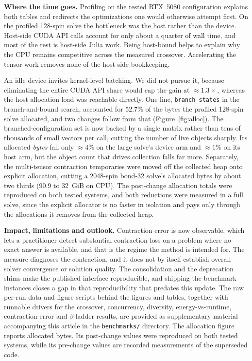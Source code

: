 \documentclass[preprint,12pt,a4paper]{elsarticle}
\begin{document}
\textbf{Where the time goes.} Profiling on the tested RTX~5080 configuration
explains both tables and redirects the optimizations one would otherwise attempt
first. On the profiled 128-spin solve the bottleneck was the host rather than the
device. Host-side CUDA API calls account for only about a quarter of wall time, and
most of the rest is host-side Julia work. Being host-bound helps to explain why
the CPU remains competitive across the measured crossover. Accelerating the tensor work removes none
of the host-side bookkeeping.

An idle device invites kernel-level batching. We did not pursue it, because
eliminating the entire CUDA API share would cap the gain at ${\approx}1.3\times$,
whereas the host allocation load was reachable directly. One line,
\texttt{branch\_states} in the branch-and-bound search, accounted for 52.7\% of the
bytes the profiled 128-spin solve allocated, and two changes follow from that
(Figure~\ref{fig:alloc}). The branched-configuration set is now backed by a single
matrix rather than tens of thousands of small vectors per call, cutting the number
of live objects sharply. Its allocated \emph{bytes} fall only ${\approx}4\%$ on the
large solve's device arm and ${\approx}1\%$ on its host arm, but the object count
that drives collection falls far more.
Separately, the multi-tensor contraction temporaries were moved off the collected
heap onto explicit allocation, cutting a 2048-spin bond-32 solve's allocated bytes
by about two thirds (90.9 to 32~GiB on CPU). The post-change allocation totals were
reproduced on both tested systems, and both reductions were measured in a full solve,
since the explicit allocator is no faster in isolation and pays only through the
allocations it removes from the collected heap.

\textbf{Impact, limitations and outlook.} Contraction error is now observable,
which lets a practitioner detect substantial contraction loss on a problem where no
exact answer is available, and that is the regime the method is intended for. The
measure diagnoses the contraction, and it does not by itself establish overall
solver convergence or solution quality. The consolidation and the deprecation shims
make the published interface reproducible, and shipping the benchmark instances
closes a gap in that reproducibility that predates this update. The raw per-run
data and figure scripts behind the figures and tables, together with runnable
drivers for the crossover, concurrency, diversity, energy-vs-runtime,
contraction-error and $\beta$-ladder results, are provided as supplementary
material accompanying this article in the \texttt{benchmarks/} directory. The allocation figure reports allocated
bytes. Its post-change values were reproduced on both tested systems, while its
pre-change values are recorded measurements of the superseded code.
\end{document}
